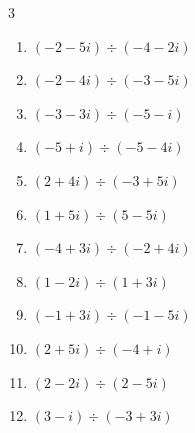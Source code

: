\begin{multicols}{3}
\begin{enumerate}
  \item $\displaystyle (-2-5i)\div(-4-2i)$


  \item $\displaystyle (-2-4i)\div(-3-5i)$


  \item $\displaystyle (-3-3i)\div(-5-i)$


  \item $\displaystyle (-5+i)\div(-5-4i)$


  \item $\displaystyle (2+4i)\div(-3+5i)$


  \item $\displaystyle (1+5i)\div(5-5i)$


\columnbreak %

  \item $\displaystyle (-4+3i)\div(-2+4i)$


  \item $\displaystyle (1-2i)\div(1+3i)$


  \item $\displaystyle (-1+3i)\div(-1-5i)$


  \item $\displaystyle (2+5i)\div(-4+i)$


  \item $\displaystyle (2-2i)\div(2-5i)$


  \item $\displaystyle (3-i)\div(-3+3i)$


\end{enumerate}
\end{multicols}
